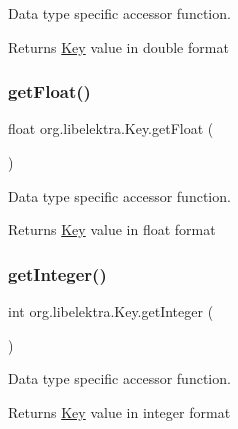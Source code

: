 Data type specific accessor function. 

\begin{DoxyReturn}{Returns}
\hyperlink{classorg_1_1libelektra_1_1Key}{Key} value in double format 
\end{DoxyReturn}
\mbox{\label{classorg_1_1libelektra_1_1Key_a24351f3c1faf4f7d69c7761aa60e69f1}} 
\subsubsection{\texorpdfstring{get\+Float()}{getFloat()}}
{\footnotesize\ttfamily float org.\+libelektra.\+Key.\+get\+Float (\begin{DoxyParamCaption}{ }\end{DoxyParamCaption})\hspace{0.3cm}{\ttfamily [inline]}}



Data type specific accessor function. 

\begin{DoxyReturn}{Returns}
\hyperlink{classorg_1_1libelektra_1_1Key}{Key} value in float format 
\end{DoxyReturn}
\mbox{\label{classorg_1_1libelektra_1_1Key_a1dfefbb75e54fd1bff57d626954fb4fc}} 
\subsubsection{\texorpdfstring{get\+Integer()}{getInteger()}}
{\footnotesize\ttfamily int org.\+libelektra.\+Key.\+get\+Integer (\begin{DoxyParamCaption}{ }\end{DoxyParamCaption})\hspace{0.3cm}{\ttfamily [inline]}}



Data type specific accessor function. 

\begin{DoxyReturn}{Returns}
\hyperlink{classorg_1_1libelektra_1_1Key}{Key} value in integer format 
\end{DoxyReturn}
\mbox{\label{classorg_1_1libelektra_1_1Key_a545c7042ebb95d4b8ad45658ebb8ec85}} 
